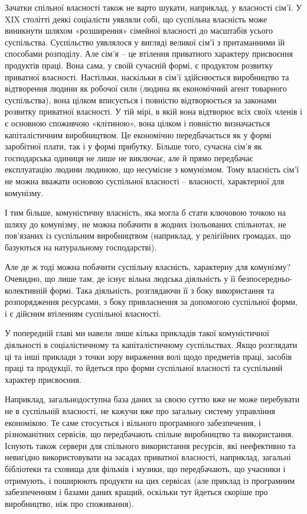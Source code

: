\documentclass[../main]{subfiles}
\begin{document}
Зачатки спільної власності також не варто шукати, наприклад, у власності сім’ї. У XIX столітті деякі соціалісти уявляли собі, що суспільна власність може виникнути шляхом «розширення» сімейної власності до масштабів усього суспільства. Суспільство уявлялося у вигляді великої сім’ї з притаманними їй способами розподілу. Але сім’я – це втілення приватного характеру присвоєння продуктів праці. Вона сама, у своїй сучасній формі, є продуктом розвитку приватної власності. Настільки, наскільки в сім’ї здійснюється виробництво та відтворення людини як робочої сили (людина як економічний агент товарного суспільства), вона цілком вписується і повністю відтворюється за законами розвитку приватної власності. У тій мірі, в якій вона відтворює всіх своїх членів і є основною споживчою «клітиною», вона цілком і повністю визначається капіталістичним виробництвом. Це економічно передбачається як у формі заробітної плати, так і у формі прибутку. Більше того, сучасна сім’я як господарська одиниця не лише не виключає, але й прямо передбачає експлуатацію людини людиною, що несумісне з комунізмом. Тому власність сім’ї не можна вважати основою суспільної власності – власності, характерної для комунізму.

І тим більше, комуністичну власність, яка могла б стати ключовою точкою на шляху до комунізму, не можна побачити в жодних ізольованих спільнотах, не пов’язаних із суспільним виробництвом (наприклад, у релігійних громадах, що базуються на натуральному господарстві).

Але де ж тоді можна побачити суспільну власність, характерну для комунізму? Очевидно, що лише там, де існує вільна людська діяльність у її безпосередньо-колективній формі. Така діяльність, розглядаючи її з боку використання та розпорядження ресурсами, з боку привласнення за допомогою суспільної форми, і є дійсним втіленням суспільної власності.

У попередній главі ми навели лише кілька прикладів такої комуністичної діяльності в соціалістичному та капіталістичному суспільствах. Якщо розглядати ці та інші приклади з точки зору вираження волі щодо предметів праці, засобів праці та продукції, то йдеться про форми суспільної власності та суспільний характер присвоєння.

Наприклад, загальнодоступна база даних за своєю суттю вже не може перебувати не в суспільній власності, не кажучи вже про загальну систему управління економікою. Те саме стосується і вільного програмного забезпечення, і різноманітних сервісів, що передбачають спільне виробництво та використання. Існують також сервери для спільного використання ресурсів, які неефективно та невигідно використовувати на засадах приватної власності, наприклад, загальні бібліотеки та сховища для фільмів і музики, що передбачають, що учасники і отримують, і поширюють продукти на цих сервісах (але приклад із програмним забезпеченням і базами даних кращий, оскільки тут йдеться скоріше про виробництво, ніж про споживання).
\end{document}
